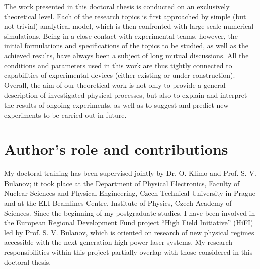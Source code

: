 \documentclass[10pt, a4paper, twoside, openright]{report}
\newcommand{\q}[1]{``#1''} %
\begin{document}
The work presented in this doctoral thesis is conducted on an exclusively theoretical level. Each of the research topics is first approached by simple (but not trivial) analytical model, which is then confronted with large-scale numerical simulations. Being in a close contact with experimental teams, however, the initial formulations and specifications of the topics to be studied, as well as the achieved results, have always been a subject of long mutual discussions. All the conditions and parameters used in this work are thus tightly connected to capabilities of experimental devices (either existing or under construction). Overall, the aim of our theoretical work is not only to provide a general description of investigated physical processes, but also to explain and interpret the results of ongoing experiments, as well as to suggest and predict new experiments to be carried out in future.


\section{Author's role and contributions}
%



My doctoral training has been supervised jointly by Dr. O. Klimo and Prof. S. V. Bulanov; it took place at the Department of Physical Electronics, Faculty of Nuclear Sciences and Physical Engineering, Czech Technical University in Prague and at the ELI Beamlines Centre, Institute of Physics, Czech Academy of Sciences. Since the beginning of my postgraduate studies, I have been involved in the European Regional Development Fund project \q{High Field Initiative} (HiFI) led by Prof. S. V. Bulanov, which is oriented on research of new physical regimes accessible with the next generation high-power laser systems. My research responsibilities within this project partially overlap with those considered in this doctoral thesis.

\end{document}
